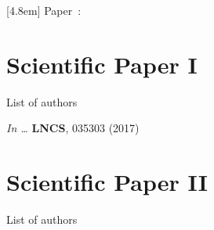 
\renewcommand{\chaptertitlename}{PAPER} 
\renewcommand\thechapter{\Alph{chapter}}

  [4.8em]%
  {\vspace*{1em}\bfseries\normalsize}%
  {\hspace*{-4.8em}Paper\ \thecontentslabel:\quad}%
  {}%
  {\normalsize\hfill\contentspage}%

\fancyhf{}
\fancyhead{} %
\renewcommand{\headrulewidth}{0pt} %
\fancyfoot[LE,RO]{\bfseries\thepage}
\pagestyle{empty}

\renewcommand{\boxsizept}{60pt} 

\chapter{Scientific Paper I}
\thispagestyle{empty}

\noindent List of authors\vspace{3ex}

\noindent \textit{In \Proc \IntlConf \ldots} \textbf{LNCS}, 035303 (2017)
\cleardoublepage



\renewcommand{\boxsizept}{52pt}
\chapter{Scientific Paper II}
\thispagestyle{empty}

\noindent List of authors\vspace{3ex}

